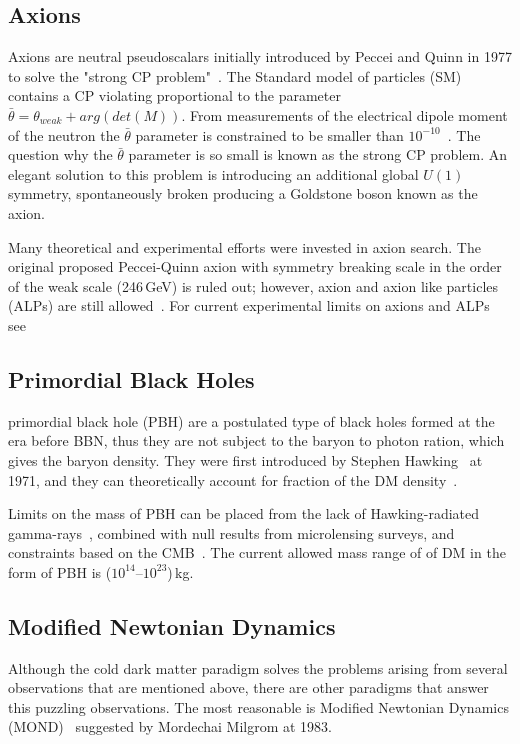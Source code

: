 \subsection{Axions}

Axions are neutral pseudoscalars initially introduced by Peccei and Quinn in 1977 to solve the "strong CP problem"~\cite{Peccei:1977hh}. The Standard model of particles (SM) contains a CP violating proportional to the parameter $\bar{\theta} = \theta_{weak}+ arg(det(M))$. From measurements  of the electrical dipole moment of the neutron the $\bar{\theta}$ parameter is constrained to be smaller than $10^{-10}$~\cite{Pospelov:2005pr,Baker:2006ts}. The question why the $\bar{\theta}$ parameter is so small is known as the strong CP problem. An elegant solution to this problem is introducing an additional global $U(1)$ symmetry, spontaneously broken producing a Goldstone boson known as the axion. 

Many theoretical and experimental efforts were invested in axion search. The original proposed Peccei-Quinn axion with symmetry breaking scale in the order of the weak scale (246\,GeV) is ruled out; however, axion and axion like particles (ALPs) are still allowed~\cite{Kim:1979if}. For current experimental limits on axions and ALPs see~\cite{Akerib:2017uem} 

\subsection{Primordial Black Holes}
primordial black hole (PBH) are a postulated type of black holes formed at the era before BBN, thus they are not subject to the baryon to photon ration, which gives the baryon density. They were first introduced by Stephen Hawking~\cite{PBH} at 1971, and they can theoretically account for fraction of the DM density~\cite{Carr:2016drx}. 

Limits on the mass of PBH can be placed from the lack
of Hawking-radiated gamma-rays~\cite{MacGibbon:1987my}, combined with null results from microlensing surveys, and constraints based on the CMB~\cite{Ricotti:2007au}. The current allowed mass range of of DM in the form of PBH is ($10^{14}$--$10^{23}$)\,kg.

\subsection{Modified Newtonian Dynamics}
\label{subsec:MOND}

Although the cold dark matter paradigm solves the problems arising from several observations that are mentioned above, there are other paradigms that answer this puzzling observations. The most reasonable is Modified Newtonian Dynamics (MOND)~\cite{Milgrom:1983ca} suggested by Mordechai Milgrom at 1983.

